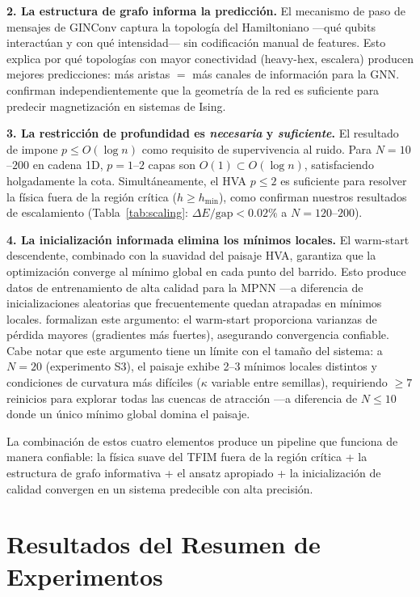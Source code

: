 \documentclass[11pt,a4paper,spanish]{book}
\begin{document}
\textbf{2. La estructura de grafo informa la predicción.} El mecanismo de paso de mensajes de GINConv captura la topología del Hamiltoniano ---qué qubits interactúan y con qué intensidad--- sin codificación manual de features. Esto explica por qué topologías con mayor conectividad (heavy-hex, escalera) producen mejores predicciones: más aristas $=$ más canales de información para la GNN. \citet{slavin2025} confirman independientemente que la geometría de la red es suficiente para predecir magnetización en sistemas de Ising.

\textbf{3. La restricción de profundidad es \emph{necesaria} y \emph{suficiente}.} El resultado de \citet{mele2026} impone $p \leq O(\log n)$ como requisito de supervivencia al ruido. Para $N = 10$--$200$ en cadena 1D, $p = 1$--$2$ capas son $O(1) \subset O(\log n)$, satisfaciendo holgadamente la cota. Simultáneamente, el HVA $p \leq 2$ es suficiente para resolver la física fuera de la región crítica ($h \geq h_{\min}$), como confirman nuestros resultados de escalamiento (Tabla~\ref{tab:scaling}: $\Delta E/\text{gap} < 0.02\%$ a $N = 120$--$200$).

\textbf{4. La inicialización informada elimina los mínimos locales.} El warm-start descendente, combinado con la suavidad del paisaje HVA, garantiza que la optimización converge al mínimo global en cada punto del barrido. Esto produce datos de entrenamiento de alta calidad para la MPNN ---a diferencia de inicializaciones aleatorias que frecuentemente quedan atrapadas en mínimos locales. \citet{puig2025} formalizan este argumento: el warm-start proporciona varianzas de pérdida mayores (gradientes más fuertes), asegurando convergencia confiable. Cabe notar que este argumento tiene un límite con el tamaño del sistema: a $N = 20$ (experimento S3), el paisaje exhibe 2--3 mínimos locales distintos y condiciones de curvatura más difíciles ($\kappa$ variable entre semillas), requiriendo $\geq 7$ reinicios para explorar todas las cuencas de atracción ---a diferencia de $N \leq 10$ donde un único mínimo global domina el paisaje.

La combinación de estos cuatro elementos produce un pipeline que funciona de manera confiable: la física suave del TFIM fuera de la región crítica + la estructura de grafo informativa + el ansatz apropiado + la inicialización de calidad convergen en un sistema predecible con alta precisión.

\section{Resultados del Resumen de Experimentos}
\end{document}
